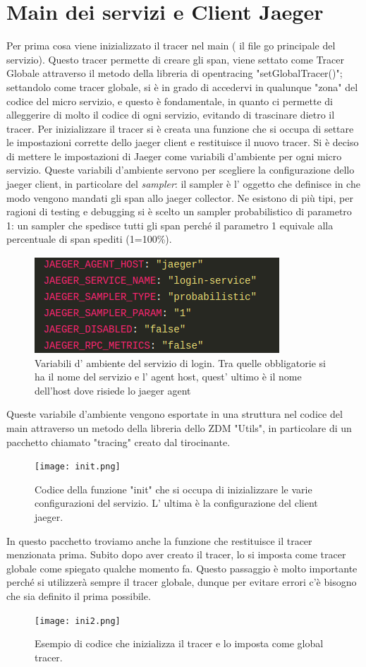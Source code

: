 \documentclass[a4paper,12pt,titlepage,italian,openany]{report}
\begin{document}
\section{Main dei servizi e Client Jaeger}
Per prima cosa viene inizializzato il tracer nel main ( il file go principale del servizio). Questo tracer permette di creare gli span, viene settato come Tracer Globale attraverso il metodo della libreria di opentracing\cite{opentracing:1} "setGlobalTracer()"; settandolo come tracer globale, si è in grado di accedervi in qualunque "zona" del codice del micro servizio, e questo è fondamentale, in quanto ci permette di alleggerire
di molto il codice di ogni servizio, evitando di trascinare dietro il tracer. Per inizializzare il tracer si è creata una funzione che si occupa di settare le impostazioni corrette dello jaeger client e restituisce il nuovo tracer. Si è deciso di mettere le impostazioni
di Jaeger come variabili d'ambiente per ogni micro servizio. Queste variabili d'ambiente servono per scegliere la configurazione dello jaeger client, in particolare del \textit{sampler}: il sampler è l' oggetto che definisce in che modo vengono mandati gli span allo jaeger collector. Ne esistono di più tipi, per ragioni di testing e debugging si è scelto un sampler probabilistico
 di parametro 1: un sampler che spedisce tutti gli span perché il parametro 1 equivale alla percentuale di span spediti (1=100\%). 
\begin{figure}[H]
    \includegraphics[scale=0.5]{envvar.png}
    \centering
    \caption{Variabili d' ambiente del servizio di login. Tra quelle obbligatorie si ha il nome del servizio e l' agent host, quest' ultimo è il nome dell'host dove risiede lo jaeger agent}
\end{figure}

Queste variabile d'ambiente vengono esportate in una struttura nel codice del main attraverso un metodo della libreria dello ZDM\cite{zdm:1} "Utils", in particolare di un pacchetto chiamato "tracing" creato dal tirocinante.
\begin{figure}[H]
    \texttt{[image: init.png]}
    \centering
    \caption{Codice della funzione "init" che si occupa di inizializzare le varie configurazioni del servizio. L' ultima è la configurazione del client jaeger.}
\end{figure}
In questo pacchetto troviamo anche la funzione che restituisce il tracer menzionata prima.
Subito dopo aver creato il tracer, lo si imposta come tracer globale come spiegato qualche momento fa. Questo passaggio è molto importante perché si utilizzerà sempre il tracer globale,
dunque per evitare errori c'è bisogno che sia definito il prima possibile.
\begin{figure}[H]
    \centering
    \texttt{[image: ini2.png]}
    \caption{Esempio di codice che inizializza il tracer e lo imposta come global tracer.}
\end{figure}
\end{document}

